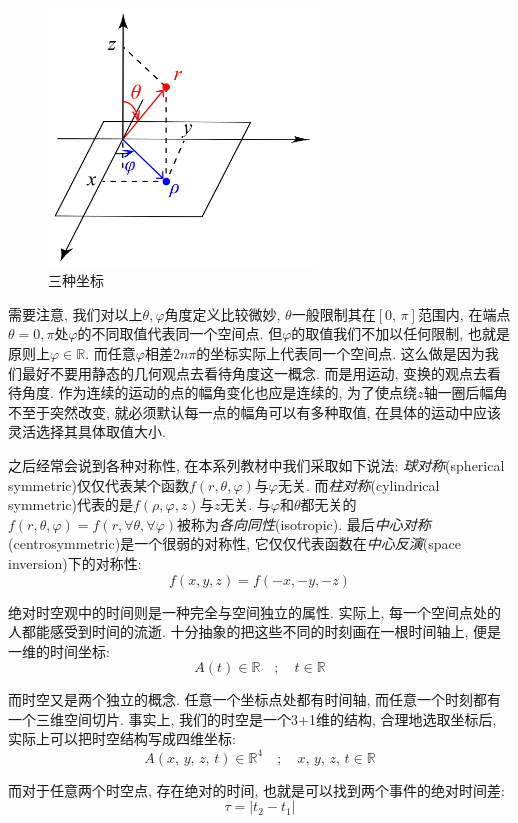 \begin{figure}
\vspace{-0.4cm}
\centering
\includegraphics[width=7cm]{image/6-1-1.png}
\caption{三种坐标}
\end{figure}
需要注意, 我们对以上$\theta, \varphi$角度定义比较微妙, $\theta$一般限制其在$[0,\,\pi]$范围内, 在端点$\theta=0, \pi$处$\varphi$的不同取值代表同一个空间点. 但$\varphi$的取值我们不加以任何限制, 也就是原则上$\varphi\in\mathbb{R}$. 而任意$\varphi$相差$2n\pi$的坐标实际上代表同一个空间点. 这么做是因为我们最好不要用静态的几何观点去看待角度这一概念. 而是用运动, 变换的观点去看待角度. 作为连续的运动的点的幅角变化也应是连续的, 为了使点绕$z$轴一圈后幅角不至于突然改变, 就必须默认每一点的幅角可以有多种取值, 在具体的运动中应该灵活选择其具体取值大小.

之后经常会说到各种对称性, 在本系列教材中我们采取如下说法: \emph{球对称}(spherical symmetric)仅仅代表某个函数$f(r,\theta,\varphi)$与$\varphi$无关. 而\emph{柱对称}(cylindrical symmetric)代表的是$f(\rho,\varphi,z)$与$z$无关. 与$\varphi$和$\theta$都无关的$f(r,\theta,\varphi)=f(r,\forall\theta,\forall\varphi)$被称为\emph{各向同性}(isotropic). 最后\emph{中心对称}(centrosymmetric)是一个很弱的对称性, 它仅仅代表函数在\emph{中心反演}(space inversion)下的对称性:
\[f(x,y,z)=f(-x,-y,-z)\]

绝对时空观中的时间则是一种完全与空间独立的属性. 实际上, 每一个空间点处的人都能感受到时间的流逝. 十分抽象的把这些不同的时刻画在一根时间轴上, 便是一维的时间坐标:
\[A(t)\in\mathbb{R} \quad;\quad t\in\mathbb{R}\]

而时空又是两个独立的概念. 任意一个坐标点处都有时间轴, 而任意一个时刻都有一个三维空间切片. 事实上, 我们的时空是一个3+1维的结构, 合理地选取坐标后, 实际上可以把时空结构写成四维坐标:
\[A(x,\,y,\,z,\,t)\in\mathbb{R}^4 \quad;\quad x,\,y,\,z,\,t\in\mathbb{R}\]

而对于任意两个时空点, 存在绝对的时间, 也就是可以找到两个事件的绝对时间差:
\[\tau=|t_2-t_1|\]

